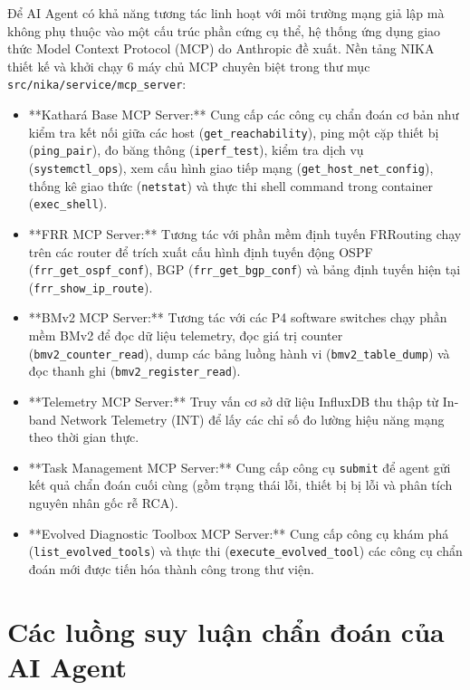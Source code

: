 Để AI Agent có khả năng tương tác linh hoạt với môi trường mạng giả lập mà không phụ thuộc vào một cấu trúc phần cứng cụ thể, hệ thống ứng dụng giao thức Model Context Protocol (MCP) do Anthropic đề xuất. Nền tảng NIKA thiết kế và khởi chạy 6 máy chủ MCP chuyên biệt trong thư mục \texttt{src/nika/service/mcp\_server}:
\begin{itemize}
    \item **Kathará Base MCP Server:** Cung cấp các công cụ chẩn đoán cơ bản như kiểm tra kết nối giữa các host (\texttt{get\_reachability}), ping một cặp thiết bị (\texttt{ping\_pair}), đo băng thông (\texttt{iperf\_test}), kiểm tra dịch vụ (\texttt{systemctl\_ops}), xem cấu hình giao tiếp mạng (\texttt{get\_host\_net\_config}), thống kê giao thức (\texttt{netstat}) và thực thi shell command trong container (\texttt{exec\_shell}).
    \item **FRR MCP Server:** Tương tác với phần mềm định tuyến FRRouting chạy trên các router để trích xuất cấu hình định tuyến động OSPF (\texttt{frr\_get\_ospf\_conf}), BGP (\texttt{frr\_get\_bgp\_conf}) và bảng định tuyến hiện tại (\texttt{frr\_show\_ip\_route}).
    \item **BMv2 MCP Server:** Tương tác với các P4 software switches chạy phần mềm BMv2 để đọc dữ liệu telemetry, đọc giá trị counter (\texttt{bmv2\_counter\_read}), dump các bảng luồng hành vi (\texttt{bmv2\_table\_dump}) và đọc thanh ghi (\texttt{bmv2\_register\_read}).
    \item **Telemetry MCP Server:** Truy vấn cơ sở dữ liệu InfluxDB thu thập từ In-band Network Telemetry (INT) để lấy các chỉ số đo lường hiệu năng mạng theo thời gian thực.
    \item **Task Management MCP Server:** Cung cấp công cụ \texttt{submit} để agent gửi kết quả chẩn đoán cuối cùng (gồm trạng thái lỗi, thiết bị bị lỗi và phân tích nguyên nhân gốc rễ RCA).
    \item **Evolved Diagnostic Toolbox MCP Server:** Cung cấp công cụ khám phá (\texttt{list\_evolved\_tools}) và thực thi (\texttt{execute\_evolved\_tool}) các công cụ chẩn đoán mới được tiến hóa thành công trong thư viện.
\end{itemize}

\section{Các luồng suy luận chẩn đoán của AI Agent}
\label{sec:agent_workflows}

